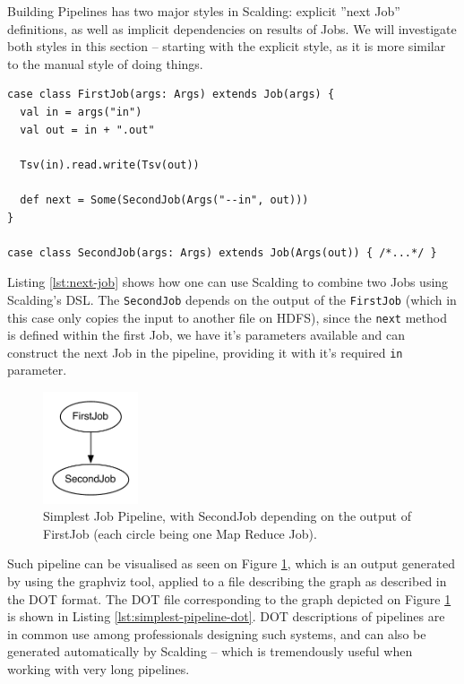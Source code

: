Building Pipelines has two major styles in Scalding: explicit ''next Job'' definitions, as well as implicit dependencies on results of Jobs. We will investigate both styles in this section -- starting with the explicit style, as it is more similar to the manual style of doing things.

\begin{lstlisting}[caption={Explicit ''next job'' definition within a Scalding Job class}, label={lst:next-job}]
case class FirstJob(args: Args) extends Job(args) {
  val in = args("in")
  val out = in + ".out"
  
  Tsv(in).read.write(Tsv(out))
  
  def next = Some(SecondJob(Args("--in", out)))
}

case class SecondJob(args: Args) extends Job(Args(out)) { /*...*/ }
\end{lstlisting}

Listing \ref{lst:next-job} shows how one can use Scalding to combine two Jobs using Scalding's DSL. The \verb|SecondJob| depends on the output of the \verb|FirstJob| (which in this case only copies the input to another file on HDFS), since the \verb|next| method is defined within the first Job, we have it's parameters available and can construct the next Job in the pipeline, providing it with it's required \verb|in| parameter. 

\begin{figure}[ch!]
  \centering
  \includegraphics[width=0.25\textwidth]{img/simplest-pipeline}
  \caption{Simplest Job Pipeline, with SecondJob depending on the output of FirstJob (each circle being one Map Reduce Job).}
  \label{fig:simplest-pipeline}
\end{figure}

Such pipeline can be visualised as seen on Figure \ref{fig:simplest-pipeline}, which is an output generated by using the graphviz tool, applied to a file describing the graph as described in the DOT format. The DOT file corresponding to the graph depicted on Figure \ref{fig:simplest-pipeline} is shown in Listing \ref{lst:simplest-pipeline-dot}. DOT descriptions of pipelines are in common use among professionals designing such systems, and can also be generated automatically by Scalding -- which is tremendously useful when working with very long pipelines.

